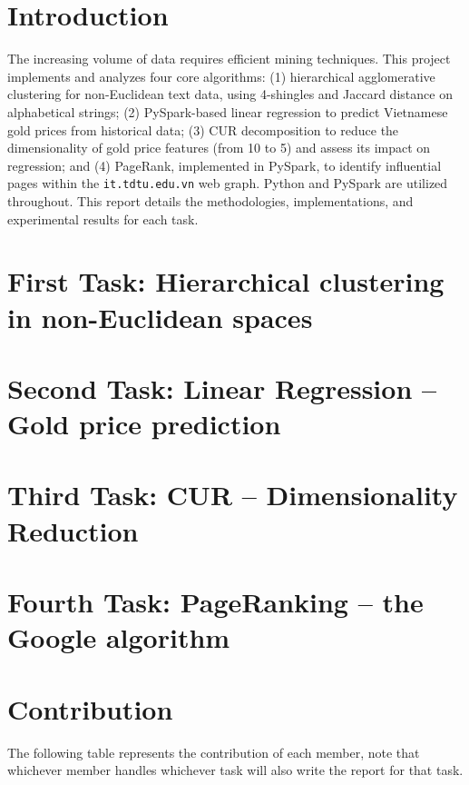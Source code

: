 \documentclass[conference]{IEEEtran}
\begin{document}
    \section{Introduction}
    \label{sec:introduction}
    The increasing volume of data requires efficient mining techniques.
    This project implements and analyzes four core algorithms: (1) hierarchical agglomerative clustering for non-Euclidean text data, using 4-shingles and Jaccard distance on alphabetical strings; (2) PySpark-based linear regression to predict Vietnamese gold prices from historical data; (3) CUR decomposition to reduce the dimensionality of gold price features (from 10 to 5) and assess its impact on regression; and (4) PageRank, implemented in PySpark, to identify influential pages within the \texttt{it.tdtu.edu.vn} web graph.
    Python and PySpark are utilized throughout.
    This report details the methodologies, implementations, and experimental results for each task.


    \section{First Task: Hierarchical clustering in non-Euclidean spaces}
    \label{sec:first-task}
    


    \section{Second Task: Linear Regression – Gold price prediction}
    \label{sec:second-task}
    


    \section{Third Task: CUR – Dimensionality Reduction}
    \label{sec:third-task}
    


    \section{Fourth Task: PageRanking – the Google algorithm}
    \label{sec:fourth-task}
    


    \section{Contribution}
    \label{sec:contribution}

    The following table represents the contribution of each member, note that whichever member handles whichever task will also write the report for that task.
\end{document}
